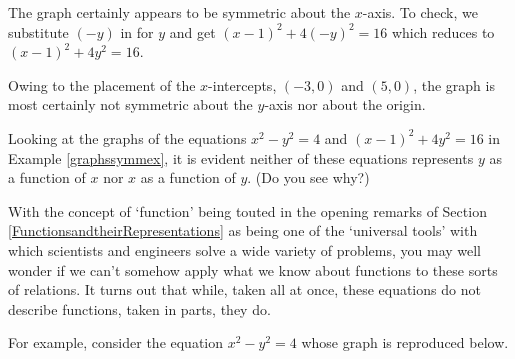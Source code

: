 \documentclass{ximera}
\begin{document}
\begin{example}
\begin{explanation}
\begin{enumerate}
\begin{image}
\end{image}


The graph certainly appears to be symmetric about the $x$-axis. To check, we substitute $(-y)$ in for $y$ and get $(x-1)^2+4(-y)^2 = 16$ which reduces to $(x-1)^2+4y^2 = 16$.  

Owing to the placement of the $x$-intercepts, $(-3,0)$ and $(5,0)$, the graph is most certainly not symmetric about the $y$-axis nor about the origin.

\end{enumerate}
\end{explanation}

\end{example}

Looking at the graphs of the equations $x^2-y^2 = 4$ and  $(x-1)^2+4y^2 = 16$ in Example \ref{graphssymmex}, it is evident neither of these equations represents $y$ as a function of $x$ nor $x$ as a function of $y$. (Do you see why?)  

With the concept of `function' being touted in the opening remarks of Section \ref{FunctionsandtheirRepresentations} as being one of the `universal tools' with which scientists and engineers solve a wide variety of problems, you may well wonder if we can't somehow apply what we know about functions to these sorts of relations.  It turns out that while, taken all at once, these equations do not describe functions, taken in parts, they do. 

For example, consider the equation $x^2 - y^2 = 4$ whose graph is reproduced below.
\end{document}
